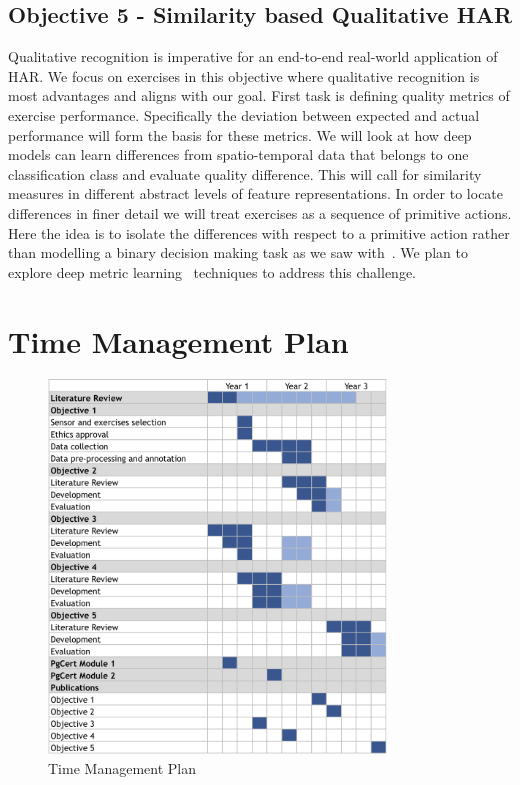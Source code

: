 \documentclass[runningheads]{llncs}
\begin{document}
\subsection{Objective 5 - Similarity based Qualitative HAR}
Qualitative recognition is imperative for an end-to-end real-world application of HAR. We focus on exercises in this objective where qualitative recognition is most advantages and aligns with our goal.
First task is defining quality metrics of exercise performance. Specifically the deviation between expected and actual performance will form the basis for these metrics.
We will look at how deep models can learn differences from spatio-temporal data that belongs to one classification class and evaluate quality difference. This will call for similarity measures in different abstract levels of feature representations. In order to locate differences in finer detail we will treat exercises as a sequence of primitive actions. Here the idea is to isolate the differences with respect to a primitive action rather than modelling a binary decision making task as we saw with~\cite{chen2013rehabilitation}. We plan to explore deep metric learning~\cite{chopra2005learning,hoffer2015deep} techniques to address this challenge.
\clearpage

\section{Time Management Plan}
\label{sec:time}
\begin{figure}[ht]
\centering
\includegraphics[width=0.8\textwidth]{plan.png}
\caption{Time Management Plan}
\end{figure}
\end{document}
